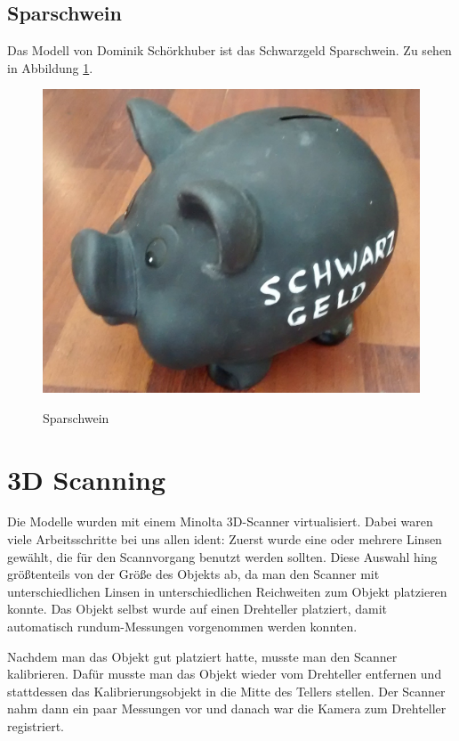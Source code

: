 \documentclass[]{article}
\begin{document}
\subsection{Sparschwein}
Das Modell von Dominik Schörkhuber ist das Schwarzgeld Sparschwein. Zu sehen in Abbildung \ref{fig:piggy}.
\begin{figure}[H]
\caption{Sparschwein}
\centering
\includegraphics[scale=0.25]{images/sparschwein/photo.jpg}
\label{fig:piggy}
\end{figure}

\section{3D Scanning} %

Die Modelle wurden mit einem Minolta 3D-Scanner virtualisiert. Dabei waren viele Arbeitsschritte bei uns allen ident: Zuerst wurde eine oder mehrere Linsen gewählt, die für den Scannvorgang benutzt werden sollten. Diese Auswahl hing größtenteils von der Größe des Objekts ab, da man den Scanner mit unterschiedlichen Linsen in unterschiedlichen Reichweiten zum Objekt platzieren konnte. Das Objekt selbst wurde auf einen Drehteller platziert, damit automatisch rundum-Messungen vorgenommen werden konnten.

Nachdem man das Objekt gut platziert hatte, musste man den Scanner kalibrieren. Dafür musste man das Objekt wieder vom Drehteller entfernen und stattdessen das Kalibrierungsobjekt in die Mitte des Tellers stellen. Der Scanner nahm dann ein paar Messungen vor und danach war die Kamera zum Drehteller registriert.
\end{document}
